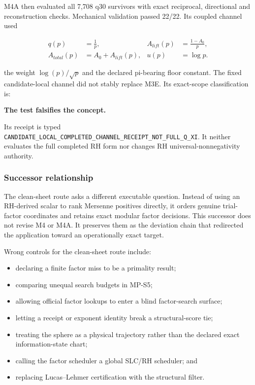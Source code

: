 M4A then evaluated all 7,708 q30 survivors with exact reciprocal,
directional and reconstruction checks. Mechanical validation passed
22/22. Its coupled channel used

\[
\begin{aligned}
q(p)&=\frac1p,& A_{lift}(p)&=\frac{1-A_0}{p},\\
A_{total}(p)&=A_0+A_{lift}(p),&u(p)&=\log p.
\end{aligned}
\]

the weight \(\log(p)/\sqrt p\) and the declared pi-bearing floor
constant. The fixed candidate-local channel did not stably replace M3E.
Its exact-scope classification is:

\textbf{The test falsifies the concept.}

Its receipt is typed
\nolinkurl{CANDIDATE_LOCAL_COMPLETED_CHANNEL_RECEIPT_NOT_FULL_Q_XI}.
It neither evaluates the full completed RH form nor changes RH
universal-nonnegativity authority.

\subsubsection{Successor relationship}\label{viii-ch10-successor-relationship}

The clean-sheet route asks a different executable question. Instead of
using an RH-derived scalar to rank Mersenne positives directly, it
orders genuine trial-factor coordinates and retains exact modular factor
decisions. This successor does not revise M4 or M4A. It preserves them
as the deviation chain that redirected the application toward an
operationally exact target.

Wrong controls for the clean-sheet route include:

\begin{itemize}
\tightlist
\item
  declaring a finite factor miss to be a primality result;
\item
  comparing unequal search budgets in MP-S5;
\item
  allowing official factor lookups to enter a blind factor-search
  surface;
\item
  letting a receipt or exponent identity break a structural-score tie;
\item
  treating the sphere as a physical trajectory rather than the declared
  exact information-state chart;
\item
  calling the factor scheduler a global SLC/RH scheduler; and
\item
  replacing Lucas--Lehmer certification with the structural filter.
\end{itemize}

